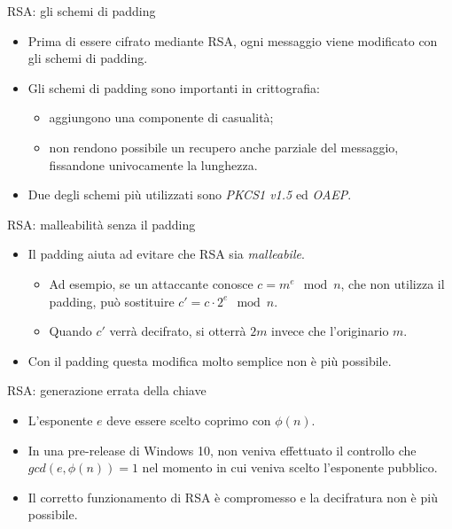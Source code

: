 \documentclass[11pt,svgnames,smaller,aspectratio=169,italian]{beamer}
\begin{document}
\begin{frame}{RSA: gli schemi di padding}
	\begin{itemize}
		\item Prima di essere cifrato mediante RSA, ogni messaggio viene modificato con gli schemi di padding.
		\item Gli schemi di padding sono importanti in crittografia:
			\begin{itemize}
				\item aggiungono una componente di casualità;
				\item non rendono possibile un recupero anche parziale del messaggio, fissandone univocamente la lunghezza.
			\end{itemize}
		\item Due degli schemi più utilizzati sono \emph{PKCS1 v1.5} ed \emph{OAEP}.
	\end{itemize}
\end{frame}

\begin{frame}{RSA: malleabilità senza il padding}
	\begin{itemize}
		\item Il padding aiuta ad evitare che RSA sia \emph{malleabile}.
			\begin{itemize}
				\item Ad esempio, se un attaccante conosce $c = m^{e} \mod n$, che non utilizza il padding, può sostituire $c' = c \cdot 2^{e} \mod n$.
				\item Quando $c'$ verrà decifrato, si otterrà $2m$ invece che l'originario $m$.
			\end{itemize}
		\item Con il padding questa modifica molto semplice non è più possibile.
	\end{itemize}
\end{frame}

\begin{frame}{RSA: generazione errata della chiave}
	\begin{itemize}
		\item L'esponente $e$ deve essere scelto coprimo con $\phi(n)$.
		\item In una pre-release di Windows 10, non veniva effettuato il controllo che $gcd(e,\phi(n)) = 1$ nel momento in cui veniva scelto l'esponente pubblico.
		\item Il corretto funzionamento di RSA è compromesso e la decifratura non è più possibile.
	\end{itemize}
\end{frame}
\end{document}
